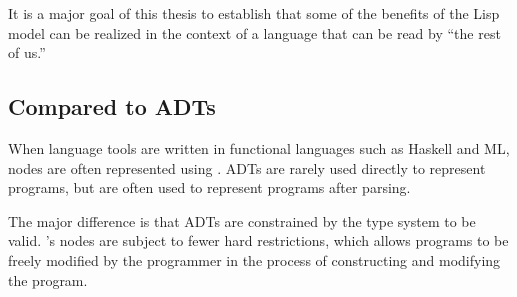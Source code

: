 It is a major goal of this thesis to establish that some of the benefits of the Lisp model can be realized in the context of a language that can be read by ``the rest of us.''

\subsection{Compared to ADTs}
When language tools are written in functional languages such as Haskell and ML, nodes are often represented using \cite{functionalAST}. ADTs are rarely used directly to represent programs, but are often used to represent programs after parsing. 

The major difference is that ADTs are constrained by the type system to be valid. \Meta's nodes are subject to fewer hard restrictions, which allows programs to be freely modified by the programmer in the process of constructing and modifying the program.
